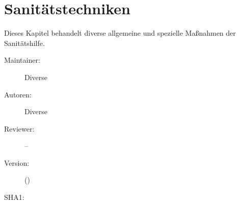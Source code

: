 \def\ChapterCode{SAN}
\chapter
[\CO{[SAN]} Sanitätstechniken]
{Sanitätstechniken}
\label{chp:SAN}

\ChapterIntro
{%
Dieses Kapitel behandelt diverse allgemeine und
spezielle Maßnahmen der Sanitätshilfe. 
}
{%
\begin{description}
  \item[Maintainer:] Diverse
  \item[Autoren:] Diverse
  \item[Reviewer:] --
  \item[Version:] {\DocVersion} ({\DocVersionInfo})
  \item[SHA1:] {\DocGitCommit}
\end{description}

{\TxTeilkapitelAASS}
}



\clearpage %


